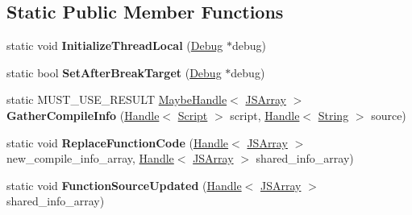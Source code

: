 \subsection*{Static Public Member Functions}
\begin{DoxyCompactItemize}
\item 
static void {\bfseries Initialize\+Thread\+Local} (\hyperlink{classv8_1_1internal_1_1_debug}{Debug} $\ast$debug)\hypertarget{classv8_1_1internal_1_1_live_edit_a9b5ea06802163d74690511e89f07cffd}{}\label{classv8_1_1internal_1_1_live_edit_a9b5ea06802163d74690511e89f07cffd}

\item 
static bool {\bfseries Set\+After\+Break\+Target} (\hyperlink{classv8_1_1internal_1_1_debug}{Debug} $\ast$debug)\hypertarget{classv8_1_1internal_1_1_live_edit_a77e2a52e13a358d14489dea92851d3fb}{}\label{classv8_1_1internal_1_1_live_edit_a77e2a52e13a358d14489dea92851d3fb}

\item 
static M\+U\+S\+T\+\_\+\+U\+S\+E\+\_\+\+R\+E\+S\+U\+LT \hyperlink{classv8_1_1internal_1_1_maybe_handle}{Maybe\+Handle}$<$ \hyperlink{classv8_1_1internal_1_1_j_s_array}{J\+S\+Array} $>$ {\bfseries Gather\+Compile\+Info} (\hyperlink{classv8_1_1internal_1_1_handle}{Handle}$<$ \hyperlink{classv8_1_1internal_1_1_script}{Script} $>$ script, \hyperlink{classv8_1_1internal_1_1_handle}{Handle}$<$ \hyperlink{classv8_1_1internal_1_1_string}{String} $>$ source)\hypertarget{classv8_1_1internal_1_1_live_edit_a58e02c86ce01ee6f35fc20b1fad03086}{}\label{classv8_1_1internal_1_1_live_edit_a58e02c86ce01ee6f35fc20b1fad03086}

\item 
static void {\bfseries Replace\+Function\+Code} (\hyperlink{classv8_1_1internal_1_1_handle}{Handle}$<$ \hyperlink{classv8_1_1internal_1_1_j_s_array}{J\+S\+Array} $>$ new\+\_\+compile\+\_\+info\+\_\+array, \hyperlink{classv8_1_1internal_1_1_handle}{Handle}$<$ \hyperlink{classv8_1_1internal_1_1_j_s_array}{J\+S\+Array} $>$ shared\+\_\+info\+\_\+array)\hypertarget{classv8_1_1internal_1_1_live_edit_a6da6ace56f1979c43e01b5fd697a06ae}{}\label{classv8_1_1internal_1_1_live_edit_a6da6ace56f1979c43e01b5fd697a06ae}

\item 
static void {\bfseries Function\+Source\+Updated} (\hyperlink{classv8_1_1internal_1_1_handle}{Handle}$<$ \hyperlink{classv8_1_1internal_1_1_j_s_array}{J\+S\+Array} $>$ shared\+\_\+info\+\_\+array)\hypertarget{classv8_1_1internal_1_1_live_edit_ac3bcd4bd0d8c13126218d67544dc6117}{}\label{classv8_1_1internal_1_1_live_edit_ac3bcd4bd0d8c13126218d67544dc6117}


\end{DoxyCompactItemize}
